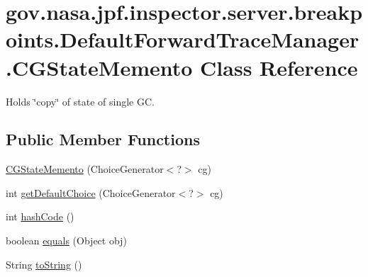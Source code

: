 \hypertarget{classgov_1_1nasa_1_1jpf_1_1inspector_1_1server_1_1breakpoints_1_1_default_forward_trace_manager_1_1_c_g_state_memento}{}\section{gov.\+nasa.\+jpf.\+inspector.\+server.\+breakpoints.\+Default\+Forward\+Trace\+Manager.\+C\+G\+State\+Memento Class Reference}
\label{classgov_1_1nasa_1_1jpf_1_1inspector_1_1server_1_1breakpoints_1_1_default_forward_trace_manager_1_1_c_g_state_memento}


Holds \char`\"{}copy\char`\"{} of state of single GC.  


\subsection*{Public Member Functions}
\begin{DoxyCompactItemize}
\item 
\hyperlink{classgov_1_1nasa_1_1jpf_1_1inspector_1_1server_1_1breakpoints_1_1_default_forward_trace_manager_1_1_c_g_state_memento_a242d2bdcd3450eca5ab5812f92d46794}{C\+G\+State\+Memento} (Choice\+Generator$<$?$>$ cg)
\item 
int \hyperlink{classgov_1_1nasa_1_1jpf_1_1inspector_1_1server_1_1breakpoints_1_1_default_forward_trace_manager_1_1_c_g_state_memento_aa8157b94e44501a14ab958737e9afa16}{get\+Default\+Choice} (Choice\+Generator$<$?$>$ cg)
\item 
int \hyperlink{classgov_1_1nasa_1_1jpf_1_1inspector_1_1server_1_1breakpoints_1_1_default_forward_trace_manager_1_1_c_g_state_memento_af7096347e4c8a54776da1eea80616d4f}{hash\+Code} ()
\item 
boolean \hyperlink{classgov_1_1nasa_1_1jpf_1_1inspector_1_1server_1_1breakpoints_1_1_default_forward_trace_manager_1_1_c_g_state_memento_ad6b5f7c5b0768fc6bcc45c54f6b1cc44}{equals} (Object obj)
\item 
String \hyperlink{classgov_1_1nasa_1_1jpf_1_1inspector_1_1server_1_1breakpoints_1_1_default_forward_trace_manager_1_1_c_g_state_memento_a2a63d62735720c90cd0769b4b37068e0}{to\+String} ()
\end{DoxyCompactItemize}
